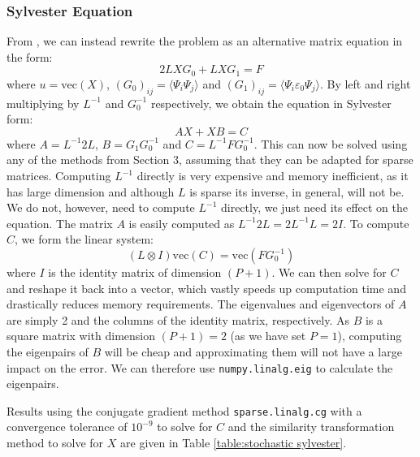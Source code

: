 \documentclass[11pt]{article}
\numberwithin{equation}{section}
\begin{document}
\subsubsection*{Sylvester Equation}
From \cite{Powell}, we can instead rewrite the problem as an alternative matrix equation in the form:
\begin{equation}
2LXG_0 + LXG_1 = F
\end{equation}
where $u = \text{vec}(X)$, $(G_0)_{ij} = \langle \Psi_i \Psi_j \rangle$ and $(G_1)_{ij} = \langle \Psi_i \varepsilon_0 \Psi_j \rangle$. By left and right multiplying by $L^{-1}$ and $G_0^{-1}$ respectively, we obtain the equation in Sylvester form:
\begin{equation}
AX + XB = C
\end{equation}
where $A = L^{-1}2L$, $B = G_1 G_0^{-1}$ and $C = L^{-1} F G_0^{-1}$. This can now be solved using any of the methods from Section 3, assuming that they can be adapted for sparse matrices. Computing $L^{-1}$ directly is very expensive and memory inefficient, as it has large dimension and although $L$ is sparse its inverse, in general, will not be. We do not, however, need to compute $L^{-1}$ directly, we just need its effect on the equation. The matrix $A$ is easily computed as $L^{-1}2L = 2L^{-1}L = 2I$. To compute $C$, we form the linear system:
\begin{equation}
(L \otimes I)\text{vec}(C) = \text{vec}(FG_0^{-1})
\end{equation}
where $I$ is the identity matrix of dimension $(P+1)$. We can then solve for $C$ and reshape it back into a vector, which vastly speeds up computation time and drastically reduces memory requirements. The eigenvalues and eigenvectors of $A$ are simply 2 and the columns of the identity matrix, respectively. As $B$ is a square matrix with dimension $(P+1)=2$ (as we have set $P=1$), computing the eigenpairs of $B$ will be cheap and approximating them will not have a large impact on the error. We can therefore use \texttt{numpy.linalg.eig} to calculate the eigenpairs.

Results using the conjugate gradient method \texttt{sparse.linalg.cg} with a convergence tolerance of $10^{-9}$ to solve for $C$ and the similarity transformation method to solve for $X$ are given in Table \ref{table:stochastic sylvester}.
\end{document}
